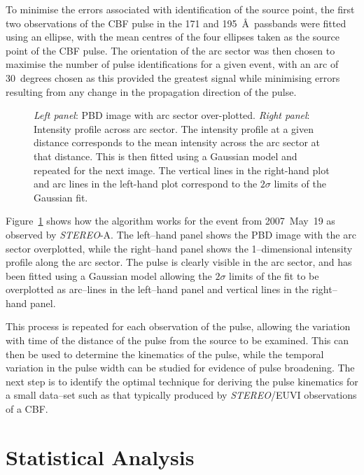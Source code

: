 To minimise the errors associated with identification of the source point, the first two observations of the CBF pulse in the 171 and 195~\AA\ passbands were fitted using an ellipse, with the mean centres of the four ellipses taken as the source point of the CBF pulse. The orientation of the arc sector was then chosen to maximise the number of pulse identifications for a given event, with an arc of 30~degrees chosen as this provided the greatest signal while minimising errors resulting from any change in the propagation direction of the pulse.

\begin{figure}[!t]
\caption{\emph{Left panel}: PBD image with arc sector over-plotted. \emph{Right panel}: Intensity profile across arc sector. The intensity profile at a given distance corresponds to the mean intensity across the arc sector at that distance. This is then fitted using a Gaussian model and repeated for the next image. The vertical lines in the right-hand plot and arc lines in the left-hand plot correspond to the $2\sigma$ limits of the Gaussian fit.}
\label{fig:algorithm}
\end{figure}

Figure~\ref{fig:algorithm} shows how the algorithm works for the event from 2007~May~19 as observed by \emph{STEREO}-A. The left--hand panel shows the PBD image with the arc sector overplotted, while the right--hand panel shows the 1--dimensional intensity profile along the arc sector. The pulse is clearly visible in the arc sector, and has been fitted using a Gaussian model allowing the $2\sigma$ limits of the fit to be overplotted as arc--lines in the left--hand panel and vertical lines in the right--hand panel.

This process is repeated for each observation of the pulse, allowing the variation with time of the distance of the pulse from the source to be examined. This can then be used to determine the kinematics of the pulse, while the temporal variation in the pulse width can be studied for evidence of pulse broadening. The next step is to identify the optimal technique for deriving the pulse kinematics for a small data--set such as that typically produced by \emph{STEREO}/EUVI observations of a CBF.

\section{Statistical Analysis}
\label{sect:stats}


